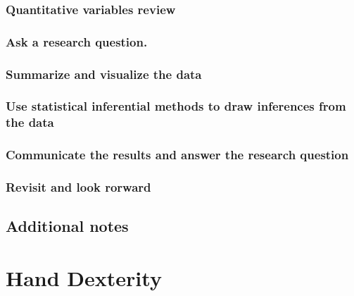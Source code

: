 \documentclass[
]{report}
\begin{document}
\hypertarget{quantitative-variables-review}{%
\subsection{Quantitative variables review}\label{quantitative-variables-review}}

\hypertarget{ask-a-research-question.}{%
\subsection{Ask a research question.}\label{ask-a-research-question.}}

\hypertarget{summarize-and-visualize-the-data}{%
\subsection{Summarize and visualize the data}\label{summarize-and-visualize-the-data}}

\hypertarget{use-statistical-inferential-methods-to-draw-inferences-from-the-data}{%
\subsection{Use statistical inferential methods to draw inferences from the data}\label{use-statistical-inferential-methods-to-draw-inferences-from-the-data}}

\hypertarget{communicate-the-results-and-answer-the-research-question}{%
\subsection{Communicate the results and answer the research question}\label{communicate-the-results-and-answer-the-research-question}}

\hypertarget{revisit-and-look-rorward}{%
\subsection{Revisit and look rorward}\label{revisit-and-look-rorward}}

\hypertarget{additional-notes}{%
\section{Additional notes}\label{additional-notes}}

\hypertarget{hand-dexterity}{%
\chapter{Hand Dexterity}\label{hand-dexterity}}
\end{document}
